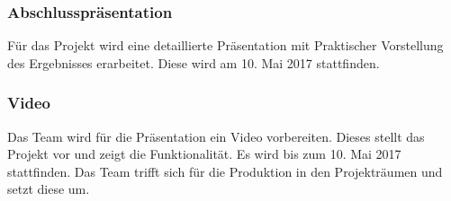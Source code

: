 \subsubsection{Abschlusspräsentation}
Für das Projekt wird eine detaillierte Präsentation mit Praktischer Vorstellung des Ergebnisses erarbeitet. Diese wird am 10. Mai 2017 stattfinden.
 \subsubsection{Video}
Das Team wird für die Präsentation ein Video vorbereiten. Dieses stellt das Projekt vor und zeigt die Funktionalität. Es wird bis zum 10. Mai 2017 stattfinden. Das Team trifft sich für die Produktion in den Projekträumen und setzt diese um.


